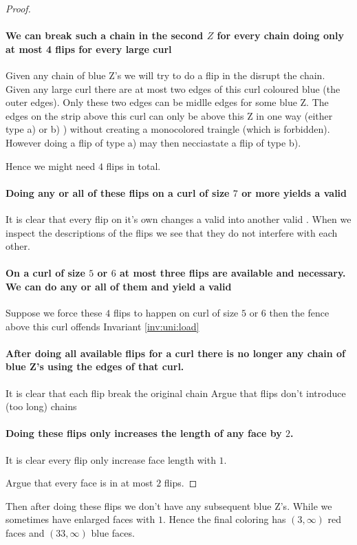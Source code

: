\begin{proof}
  \paragraph{We can break such a chain in the second $Z$ for every chain doing only at most 4 flips for every large curl}
  Given any chain of blue Z's we will try to do a flip in the disrupt the chain. Given any large curl there are at most two edges of this curl coloured blue (the outer edges). Only these two edges can be midlle edges for some blue Z. The edges on the strip above this curl can only be above this Z in one way (either type a) or b) ) without creating a monocolored traingle (which is forbidden). However doing a flip of type a) may then necciastate a flip of type b).

  Hence we might need $4$ flips in total.

  \paragraph{Doing any or all of these flips on a curl of size $7$ or more yields a valid \rel}
  It is clear that every flip on it's own changes a valid \rel into another valid \rel.
  When we inspect the descriptions of the flips we see that they do not interfere with each other.

  \paragraph{On a curl of size $5$ or $6$ at most three flips are available and necessary. We can do any or all of them and yield a valid \rel}

  Suppose we force these $4$ flips to happen on curl of size $5$ or $6$ then the fence above this curl offends Invariant \ref{inv:uni:load}


  \paragraph{After doing all available flips for a curl there is no longer any chain of blue Z's using the edges of that curl.}
  It is clear that each flip break the original chain
  Argue that flips don't introduce (too long) chains

  \paragraph{Doing these flips only increases the length of any face by $2$.}
  It is clear every flip only increase face length with $1$.

  Argue that every face is in at most $2$ flips.



\end{proof}


Then after doing these flips we don't have any subsequent blue Z's. While we sometimes have enlarged faces with $1$.  Hence the final coloring has $(3, \infty)$ red faces and $(33, \infty)$ blue faces.
